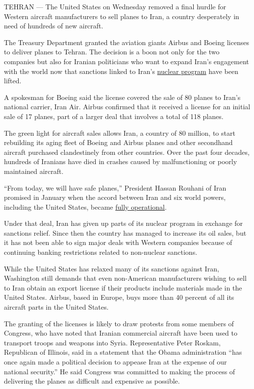 TEHRAN --- The United States on Wednesday removed a final hurdle for
Western aircraft manufacturers to sell planes to Iran, a country
desperately in need of hundreds of new aircraft.

The Treasury Department granted the aviation giants Airbus and Boeing
licenses to deliver planes to Tehran. The decision is a boon not only
for the two companies but also for Iranian politicians who want to
expand Iran's engagement with the world now that sanctions linked to
Iran's
\href{http://topics.nytimes3xbfgragh.onion/top/news/international/countriesandterritories/iran/nuclear_program/index.html?inline=nyt-classifier}{nuclear
program} have been lifted.

A spokesman for Boeing said the license covered the sale of 80 planes to
Iran's national carrier, Iran Air. Airbus confirmed that it received a
license for an initial sale of 17 planes, part of a larger deal that
involves a total of 118 planes.

The green light for aircraft sales allows Iran, a country of 80 million,
to start rebuilding its aging fleet of Boeing and Airbus planes and
other secondhand aircraft purchased clandestinely from other countries.
Over the past four decades, hundreds of Iranians have died in crashes
caused by malfunctioning or poorly maintained aircraft.

``From today, we will have safe planes,'' President Hassan Rouhani of
Iran promised in January when the accord between Iran and six world
powers, including the United States, became
\href{http://www.nytimes3xbfgragh.onion/2016/01/17/world/middleeast/iran-sanctions-lifted-nuclear-deal.html}{fully
operational}.

Under that deal, Iran has given up parts of its nuclear program in
exchange for sanctions relief. Since then the country has managed to
increase its oil sales, but it has not been able to sign major deals
with Western companies because of continuing banking restrictions
related to non-nuclear sanctions.

While the United States has relaxed many of its sanctions against Iran,
Washington still demands that even non-American manufacturers wishing to
sell to Iran obtain an export license if their products include
materials made in the United States. Airbus, based in Europe, buys more
than 40 percent of all its aircraft parts in the United States.

The granting of the licenses is likely to draw protests from some
members of Congress, who have noted that Iranian commercial aircraft
have been used to transport troops and weapons into Syria.
Representative Peter Roskam, Republican of Illinois, said in a statement
that the Obama administration ``has once again made a political decision
to appease Iran at the expense of our national security.'' He said
Congress was committed to making the process of delivering the planes as
difficult and expensive as possible.

